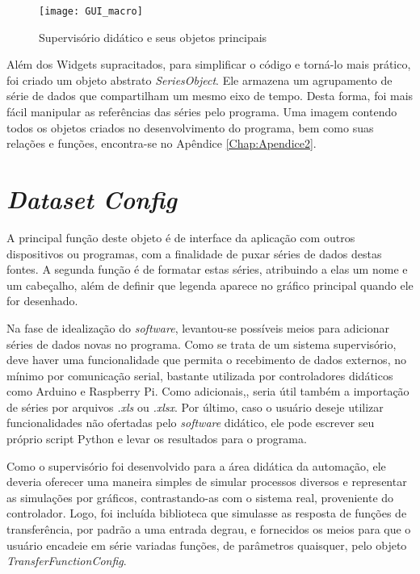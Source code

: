 \begin{figure}[hbt]
	\centering
	\caption{Supervisório didático e seus objetos principais}
	\texttt{[image: GUI\_macro]}
	\label{img_gui_macro}
\end{figure}

Além dos Widgets supracitados, para simplificar o código e torná-lo mais prático, foi criado um objeto abstrato \emph{SeriesObject}. Ele armazena um agrupamento de série de dados que compartilham um mesmo eixo de tempo. Desta forma, foi mais fácil manipular as referências das séries pelo programa. Uma imagem contendo todos os objetos criados no desenvolvimento do programa, bem como suas relações e funções, encontra-se no Apêndice \ref{Chap:Apendice2}.

\section{\emph{Dataset Config}}

A principal função deste objeto é de interface da aplicação com outros dispositivos ou programas, com a finalidade de puxar séries de dados destas fontes. A segunda função é de formatar estas séries, atribuindo a elas um nome e um cabeçalho, além de definir que legenda aparece no gráfico principal quando ele for desenhado.

Na fase de idealização do \emph{software}, levantou-se possíveis meios para adicionar séries de dados novas no programa. Como se trata de um sistema supervisório, deve haver uma funcionalidade que permita o recebimento de dados externos, no mínimo por comunicação serial, bastante utilizada por controladores didáticos como Arduino e Raspberry Pi. Como adicionais,, seria útil também a importação de séries por arquivos \emph{.xls} ou \emph{.xlsx}. Por último, caso o usuário deseje utilizar funcionalidades não ofertadas pelo \textit{software} didático, ele pode escrever seu próprio script Python e levar os resultados para o programa.

Como o supervisório foi desenvolvido para a área didática da automação, ele deveria oferecer uma maneira simples de simular processos diversos e representar as simulações por gráficos, contrastando-as com o sistema real, proveniente do controlador. Logo, foi incluída biblioteca que simulasse as resposta de funções de transferência, por padrão a uma entrada degrau, e fornecidos os meios para que o usuário encadeie em série variadas funções, de parâmetros quaisquer, pelo objeto \emph{TransferFunctionConfig}.

